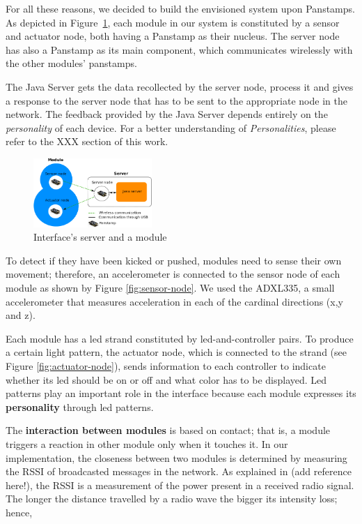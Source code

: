 For all these reasons, we decided to build the envisioned system upon Panstamps. As depicted in Figure~\ref{fig:server-module}, each module in our system is constituted by a sensor and actuator node, both having a Panstamp as their nucleus. The server node has also a Panstamp as its main component, which communicates wirelessly with the other modules' panstamps. 

The Java Server gets the data recollected by the server node, process it and gives a response to the server node that has to be sent to the appropriate node in the network. The feedback provided by the Java Server depends entirely on the \emph{personality} of each device. For a better understanding of \emph{Personalities}, please refer to the XXX section of this work.

\begin{figure}[h!]
 \centering
 \includegraphics[width= 0.4\textwidth, clip=true  ,keepaspectratio=true]{./graph/entity_server.png}
 \caption{Interface's server and a module}
 \label{fig:server-module}
\end{figure}

To detect if they have been kicked or pushed, modules need to sense their own movement; therefore, an accelerometer is connected to the sensor node of each module as shown by Figure \ref{fig:sensor-node}. We used the ADXL335, a small accelerometer that measures acceleration in each of the cardinal directions (x,y and z).

Each module has a led strand constituted by led-and-controller pairs. To produce a certain light pattern, the actuator node, which is connected to the strand (see Figure \ref{fig:actuator-node}), sends information to each controller to indicate whether its led should be on or off and what color has to be displayed. Led patterns play an important role in the interface because each module expresses its \textbf{personality} through led patterns.  

The \textbf{interaction between modules} is based on contact; that is, a module triggers a reaction in other module only when it touches it. In our implementation, the closeness between two modules is determined by measuring the RSSI of broadcasted messages in the network. As explained in (add reference here!), the RSSI is a measurement of the power present in a received radio signal. The longer the distance travelled by a radio wave the bigger its intensity loss; hence,    



